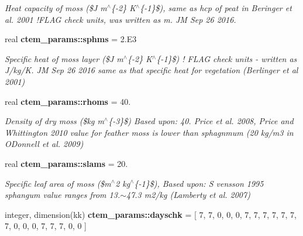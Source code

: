 \begin{DoxyCompactItemize}
\begin{DoxyCompactList}\small\item\em Heat capacity of moss (\$\+J m$^\wedge$\{-\/2\} K$^\wedge$\{-\/1\}\$), same as hcp of peat in Beringer et al. 2001 !\+F\+L\+A\+G check units, was written as m. J\+M Sep 26 2016. \end{DoxyCompactList}\item 
\hypertarget{namespacectem__params_a3e2f054f042fe780406031cd62d85353}{}real {\bfseries ctem\+\_\+params\+::sphms} = 2.\+E3\label{namespacectem__params_a3e2f054f042fe780406031cd62d85353}

\begin{DoxyCompactList}\small\item\em Specific heat of moss layer (\$\+J m$^\wedge$\{-\/2\} K$^\wedge$\{-\/1\}\$) ! F\+L\+A\+G check units -\/ written as J/kg/\+K. J\+M Sep 26 2016 same as that specific heat for vegetation (Berlinger et al 2001) \end{DoxyCompactList}\item 
\hypertarget{namespacectem__params_a6906db810ec862d793e7d622e4844876}{}real {\bfseries ctem\+\_\+params\+::rhoms} = 40.\label{namespacectem__params_a6906db810ec862d793e7d622e4844876}

\begin{DoxyCompactList}\small\item\em Density of dry moss (\$kg m$^\wedge$\{-\/3\}\$) Based upon\+: 40. Price et al. 2008, Price and Whittington 2010 value for feather moss is lower than sphagnmum (20 kg/m3 in O\textquotesingle{}Donnell et al. 2009) \end{DoxyCompactList}\item 
\hypertarget{namespacectem__params_ae2728ff345f2e78d11b2a978101c67f2}{}real {\bfseries ctem\+\_\+params\+::slams} = 20.\label{namespacectem__params_ae2728ff345f2e78d11b2a978101c67f2}

\begin{DoxyCompactList}\small\item\em Specific leaf area of moss (\$m$^\wedge$2 kg$^\wedge$\{-\/1\}\$), Based upon\+: S vensson 1995 sphangum value ranges from 13.$\sim$47.3 m2/kg (Lamberty et al. 2007) \end{DoxyCompactList}\item 
\hypertarget{namespacectem__params_abae86d324b328aaf473431198d8e3642}{}integer, dimension(kk) {\bfseries ctem\+\_\+params\+::dayschk} = \mbox{[} 7, 7, 0, 0, 0, 7, 7, 7, 7, 7, 7, 7, 0, 0, 0, 7, 7, 7, 0, 0 \mbox{]}\label{namespacectem__params_abae86d324b328aaf473431198d8e3642}


\end{DoxyCompactItemize}
